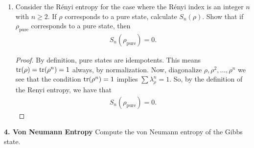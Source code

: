 \documentclass{book}
\theoremstyle{definition}
\newcommand{\nn}{\nonumber}
\newcommand{\f}[2]{\frac{#1}{#2}}
\newcommand{\lp}{\left(}
\newcommand{\rp}{\right)}
\newcommand{\lb}{\left[}
\newcommand{\rb}{\right]}
\begin{document}
\begin{enumerate}
\begin{proof}
		But we can also do this using l'Hopital's rule:
		\begin{align}
		\lim_{q\to 1}S_q(\rho) &= \f{1}{\ln 2}\lim_{q\to 1} \lb \f{\log \lp\sum_i \lambda_i^q\rp}{1-q} \rb\nn\\
		&= \f{1}{\ln 2}\lim_{q\to 1} \lb \f{ \f{1}{\sum_i \lambda_i^q} \sum_i \f{d}{dq} \lambda_i^q}{-1} \rb\nn\\
		&= \f{1}{\ln 2}\lim_{q\to 1}\lb   -\f{\sum_i \lambda_i^q} \sum_i  \lambda_i^q \ln \lambda_i\rb\nn\\
		&= -\f{1}{\sum_i\lambda_i}\sum_i \f{\ln \lambda_i}{\ln 2}\nn\\
		&= -\sum_i \lambda_i \log \lambda_i\nn\\
		&= S_{vn}(\rho).
		\end{align}
	\end{proof}
	
	
	
	
	\item Consider the R\'enyi entropy for the case where the R\'enyi index is an integer $n$ with $n \geq 2$. If $\rho$ corresponds to a pure state, calculate $S_n(\rho)$. Show that if $\rho_\text{pure}$ corresponds to a pure state, then
	\begin{align}
	S_n(\rho_\text{pure}) = 0.
	\end{align}
	
	\begin{proof}
		By definition, pure states are idempotents. This means $\tr(\rho) = \tr(\rho^n) = 1$ always, by normalization. Now, diagonalize $\rho, \rho^2, \dots, \rho^n$ we see that the condition $\tr(\rho^n) = 1$ implies $\sum \lambda_\rho^n = 1$. So, by the definition of the Renyi entropy, we have that 
		\begin{align}
		S_n(\rho_\text{pure}) = 0.
		\end{align}
	\end{proof}
	
	
	
\end{enumerate}




\noindent \textbf{4. Von Neumann Entropy}
Compute the von Neumann entropy of the Gibbs state.
\end{document}
